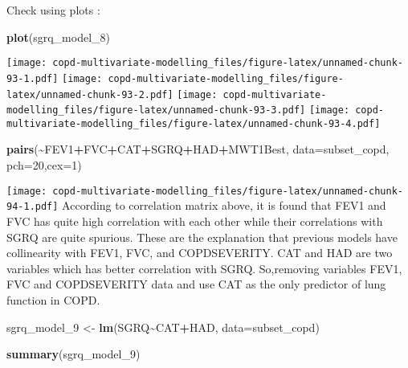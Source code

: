\documentclass[
]{article}
\newenvironment{Shaded}{\begin{snugshade}}{\end{snugshade}}
\newcommand{\AttributeTok}[1]{\textcolor[rgb]{0.13,0.29,0.53}{#1}}
\newcommand{\DecValTok}[1]{\textcolor[rgb]{0.00,0.00,0.81}{#1}}
\newcommand{\FunctionTok}[1]{\textcolor[rgb]{0.13,0.29,0.53}{\textbf{#1}}}
\newcommand{\NormalTok}[1]{#1}
\newcommand{\OtherTok}[1]{\textcolor[rgb]{0.56,0.35,0.01}{#1}}
\newcommand{\SpecialCharTok}[1]{\textcolor[rgb]{0.81,0.36,0.00}{\textbf{#1}}}
\begin{document}
Check using plots :

\begin{Shaded}
\begin{Highlighting}[]
\FunctionTok{plot}\NormalTok{(sgrq\_model\_8)}
\end{Highlighting}
\end{Shaded}

\texttt{[image: copd-multivariate-modelling\_files/figure-latex/unnamed-chunk-93-1.pdf]}
\texttt{[image: copd-multivariate-modelling\_files/figure-latex/unnamed-chunk-93-2.pdf]}
\texttt{[image: copd-multivariate-modelling\_files/figure-latex/unnamed-chunk-93-3.pdf]}
\texttt{[image: copd-multivariate-modelling\_files/figure-latex/unnamed-chunk-93-4.pdf]}

\begin{Shaded}
\begin{Highlighting}[]
\FunctionTok{pairs}\NormalTok{(}\SpecialCharTok{\textasciitilde{}}\NormalTok{FEV1}\SpecialCharTok{+}\NormalTok{FVC}\SpecialCharTok{+}\NormalTok{CAT}\SpecialCharTok{+}\NormalTok{SGRQ}\SpecialCharTok{+}\NormalTok{HAD}\SpecialCharTok{+}\NormalTok{MWT1Best, }\AttributeTok{data=}\NormalTok{subset\_copd, }\AttributeTok{pch=}\DecValTok{20}\NormalTok{,}\AttributeTok{cex=}\DecValTok{1}\NormalTok{)}
\end{Highlighting}
\end{Shaded}

\texttt{[image: copd-multivariate-modelling\_files/figure-latex/unnamed-chunk-94-1.pdf]}
According to correlation matrix above, it is found that FEV1 and FVC has
quite high correlation with each other while their correlations with
SGRQ are quite spurious. These are the explanation that previous models
have collinearity with FEV1, FVC, and COPDSEVERITY. CAT and HAD are two
variables which has better correlation with SGRQ. So,removing variables
FEV1, FVC and COPDSEVERITY data and use CAT as the only predictor of
lung function in COPD.

\begin{Shaded}
\begin{Highlighting}[]
\NormalTok{sgrq\_model\_9 }\OtherTok{\textless{}{-}} \FunctionTok{lm}\NormalTok{(SGRQ}\SpecialCharTok{\textasciitilde{}}\NormalTok{CAT}\SpecialCharTok{+}\NormalTok{HAD, }\AttributeTok{data=}\NormalTok{subset\_copd)}
\end{Highlighting}
\end{Shaded}

\begin{Shaded}
\begin{Highlighting}[]
\FunctionTok{summary}\NormalTok{(sgrq\_model\_9)}
\end{Highlighting}
\end{Shaded}
\end{document}
